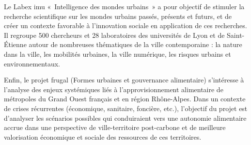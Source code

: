 Le Labex {\sc imu} « Intelligence des mondes urbains » a pour objectif de stimuler
la recherche scientifique
sur les mondes urbains passés, présents et futurs, et de créer un contexte favorable
à l'innovation sociale
en application de ces recherches. Il regroupe 500 chercheurs
et 28 laboratoires des universités de Lyon et de Saint-Étienne
autour de nombreuses thématiques de la ville contemporaine :
la nature dans la ville, les mobilités urbaines, la ville numérique,
les risques urbains et environnementaux.

Enfin, le projet {\sc frugal} (Formes urbaines et gouvernance alimentaire)
s'intéresse à  l’analyse   des   enjeux   systémiques   liés   à
l’approvisionnement alimentaire de métropoles du Grand Ouest français et en région Rhône-Alpes.
Dans un contexte de crises récurrentes (économique, sanitaire, foncière, etc.), 
l'objectif du projet est d'analyser les scénarios possibles qui conduiraient vers une 
autonomie alimentaire accrue dans une perspective de ville-territoire
post-carbone et de meilleure valorisation économique et sociale des ressources de ces
territoires.